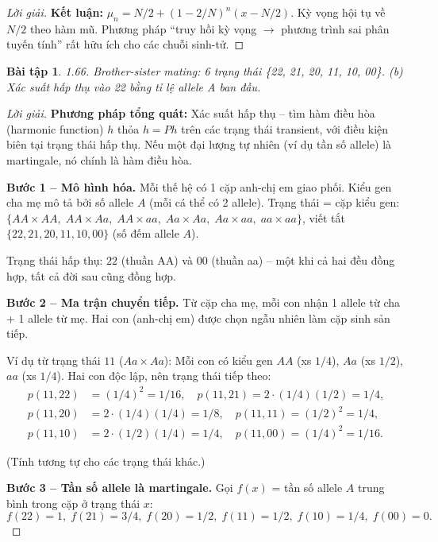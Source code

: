 \documentclass[8pt,a4paper]{article}
\newtheorem{exercise}{Bài tập}
\newenvironment{solution}{\begin{proof}[Lời giải]}{\end{proof}}
\begin{document}
\begin{solution}
\textbf{Kết luận:} $\mu_n = N/2 + (1-2/N)^n(x - N/2)$. Kỳ vọng hội tụ về $N/2$ theo hàm mũ. Phương pháp ``truy hồi kỳ vọng $\to$ phương trình sai phân tuyến tính'' rất hữu ích cho các chuỗi sinh-tử.
\end{solution}

\begin{exercise}
1.66. Brother-sister mating: 6 trạng thái \{22, 21, 20, 11, 10, 00\}. 
(b) Xác suất hấp thụ vào 22 bằng tỉ lệ allele A ban đầu.
\end{exercise}
\begin{solution}
\textbf{Phương pháp tổng quát:} Xác suất hấp thụ -- tìm hàm điều hòa (harmonic function) $h$ thỏa $h = Ph$ trên các trạng thái transient, với điều kiện biên tại trạng thái hấp thụ. Nếu một đại lượng tự nhiên (ví dụ tần số allele) là martingale, nó chính là hàm điều hòa.

\textbf{Bước 1 -- Mô hình hóa.}
Mỗi thế hệ có 1 cặp anh-chị em giao phối. Kiểu gen cha mẹ mô tả bởi số allele $A$ (mỗi cá thể có 2 allele). Trạng thái = cặp kiểu gen: $\{AA \times AA,\; AA \times Aa,\; AA \times aa,\; Aa \times Aa,\; Aa \times aa,\; aa \times aa\}$, viết tắt $\{22, 21, 20, 11, 10, 00\}$ (số đếm allele $A$).

Trạng thái hấp thụ: $22$ (thuần AA) và $00$ (thuần aa) -- một khi cả hai đều đồng hợp, tất cả đời sau cũng đồng hợp.

\textbf{Bước 2 -- Ma trận chuyển tiếp.}
Từ cặp cha mẹ, mỗi con nhận 1 allele từ cha + 1 allele từ mẹ. Hai con (anh-chị em) được chọn ngẫu nhiên làm cặp sinh sản tiếp.

Ví dụ từ trạng thái $11$ ($Aa \times Aa$): Mỗi con có kiểu gen $AA$ (xs $1/4$), $Aa$ (xs $1/2$), $aa$ (xs $1/4$). Hai con độc lập, nên trạng thái tiếp theo:
\begin{align*}
  p(11, 22) &= (1/4)^2 = 1/16, \quad p(11, 21) = 2 \cdot (1/4)(1/2) = 1/4, \\
  p(11, 20) &= 2 \cdot (1/4)(1/4) = 1/8, \quad p(11, 11) = (1/2)^2 = 1/4, \\
  p(11, 10) &= 2 \cdot (1/2)(1/4) = 1/4, \quad p(11, 00) = (1/4)^2 = 1/16.
\end{align*}

(Tính tương tự cho các trạng thái khác.)

\textbf{Bước 3 -- Tần số allele là martingale.}
Gọi $f(x)$ = tần số allele $A$ trung bình trong cặp ở trạng thái $x$:
\[
  f(22) = 1, \; f(21) = 3/4, \; f(20) = 1/2, \; f(11) = 1/2, \; f(10) = 1/4, \; f(00) = 0.
\]


\end{solution}
\end{document}
